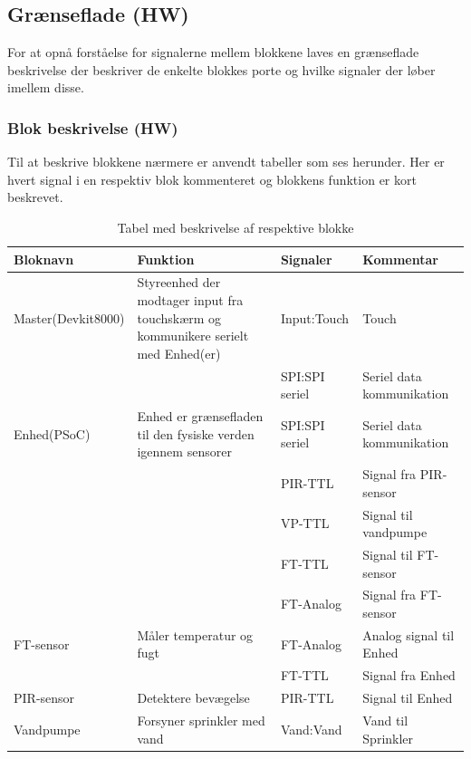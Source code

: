 \begin{table}[H] %
\subsection{Grænseflade (HW)}
For at opnå forståelse for signalerne mellem blokkene laves en grænseflade beskrivelse der beskriver de enkelte blokkes porte og hvilke signaler der løber imellem disse.

\subsubsection{Blok beskrivelse (HW)}
Til at beskrive blokkene nærmere er anvendt tabeller som ses herunder. Her er hvert signal i en respektiv blok kommenteret og blokkens funktion er kort beskrevet. 

\caption{Tabel med beskrivelse af respektive blokke}
\begin{small}
\begin{tabular}{|p{}|p{}|p{}|p{}|}
\hline
\textbf{Bloknavn} & \textbf{Funktion} & \textbf{Signaler} & \textbf{Kommentar} \\ \hline

Master(Devkit8000) & Styreenhed der modtager input fra touchskærm og kommunikere serielt med Enhed(er) & Input:Touch & Touch \\ \cline{3-4}	
& 				   & SPI:SPI seriel & Seriel data kommunikation \\ \hline

Enhed(PSoC) & Enhed er grænsefladen til den fysiske verden igennem sensorer & SPI:SPI seriel & Seriel data kommunikation \\ \cline{3-4}
& & PIR-TTL 		& Signal fra PIR-sensor	\\ \cline{3-4}
& & VP-TTL 		& Signal til vandpumpe 	\\ \cline{3-4}
& & FT-TTL 		& Signal til FT-sensor 	\\ \cline{3-4}
& & FT-Analog 	& Signal fra FT-sensor 	\\ \hline

FT-sensor & Måler temperatur og fugt & FT-Analog & Analog signal til Enhed \\ \cline{3-4}
& & FT-TTL 	& Signal fra Enhed 	\\ \hline

PIR-sensor & Detektere bevægelse & PIR-TTL & Signal til Enhed \\ \hline

Vandpumpe & Forsyner sprinkler med vand & Vand:Vand & Vand til Sprinkler \\ \hline
 

\end{tabular}
\end{small}
\end{table}
